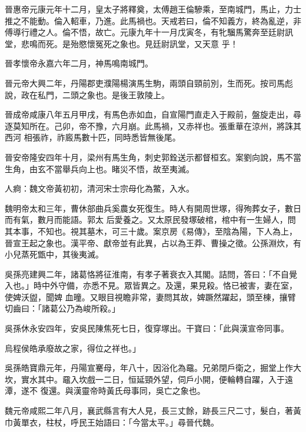 \begin{pinyinscope}
 晉惠帝元康元年十二月，皇太子將釋奠，太傅趙王倫驂乘，至南城門，馬止，力士推之不能動。倫入軺車，乃進。此馬禍也。天戒若曰，倫不知義方，終為亂逆，非傅導行禮之人。倫不悟，故亡。元康九年十一月戊寅冬，有牝騮馬驚奔至廷尉訊堂，悲鳴而死。是殆愍懷冤死之象也。見廷尉訊堂，又天意
 乎！



 晉孝懷帝永嘉六年二月，神馬鳴南城門。



 晉元帝大興二年，丹陽郡吏濮陽楊演馬生駒，兩頭自頸前別，生而死。按司馬彪說，政在私門，二頭之象也。是後王敦陵上。



 晉成帝咸康八年五月甲戌，有馬色赤如血，自宣陽門直走入于殿前，盤旋走出，尋逐莫知所在。己卯，帝不豫，六月崩。此馬禍，又赤祥也。張重華在涼州，將誅其西河
 相張祚，祚廄馬數十匹，同時悉皆無後尾。



 晉安帝隆安四年十月，梁州有馬生角，刺史郭銓送示都督桓玄。案劉向說，馬不當生角，由玄不當舉兵向上也。睹災不悟，故至夷滅。



 人痾：魏文帝黃初初，清河宋士宗母化為鱉，入水。



 魏明帝太和三年，曹休部曲兵奚農女死復生。時人有開周世塚，得殉葬女子，數日而有氣，數月而能語。郭太
 后愛養之。又太原民發塚破棺，棺中有一生婦人，問其本事，不知也。視其墓木，可三十歲。案京房《易傳》，至陰為陽，下人為上，晉宣王起之象也。漢平帝、獻帝並有此異，占以為王莽、曹操之徵。公孫淵炊，有小兒蒸死甑中，其後夷滅。



 吳孫亮建興二年，諸葛恪將征淮南，有孝子著衰衣入其閣。詰問，答曰：「不自覺入也。」時中外守備，亦悉不見。眾皆異之。及還，果見殺。恪已被害，妻在室，使婢沃盥，聞婢
 血曈。又眼目視瞻非常，妻問其故，婢蹶然躍起，頭至棟，攘臂切齒曰：「諸葛公乃為峻所殺。」



 吳孫休永安四年，安吳民陳焦死七日，復穿塚出。干寶曰：「此與漢宣帝同事。



 烏程侯皓承廢故之家，得位之祥也。」



 吳孫皓寶鼎元年，丹陽宣騫母，年八十，因浴化為黿。兄弟閉戶衛之，掘堂上作大坎，實水其中。黿入坎戲一二日，恒延頸外望，伺戶小開，便輪轉自躍，入于遠潭，遂不
 復還。與漢靈帝時黃氏母事同，吳亡之象也。



 魏元帝咸熙二年八月，襄武縣言有大人見，長三丈餘，跡長三尺二寸，髮白，著黃巾黃單衣，柱杖，呼民王始語曰：「今當太平。」尋晉代魏。




\end{pinyinscope}
